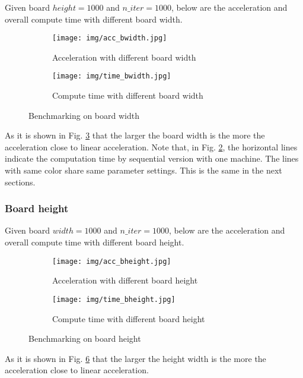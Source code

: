 \documentclass[sigchi]{acmart}
\begin{document}
Given board $height=1000$ and $n\_iter=1000$, below are the acceleration and overall compute time with different board width.
\begin{figure}[H]
  \begin{subfigure}[b]{0.45\textwidth}
      \texttt{[image: img/acc\_bwidth.jpg]}
      \caption{Acceleration with different board width}
      \label{fig:acc_bwidth}
  \end{subfigure}

  \begin{subfigure}[b]{0.45\textwidth}
    \texttt{[image: img/time\_bwidth.jpg]}
    \caption{Compute time with different board width}
    \label{fig:time_bwidth}
  \end{subfigure}
  \caption{Benchmarking on board width}
  \label{fig:bwidth}
  
\end{figure}

As it is shown in Fig. \ref{fig:bwidth} that the larger the board width is the more the acceleration close to linear acceleration.
Note that, in Fig. \ref{fig:time_bwidth}, the horizontal lines indicate the computation time by sequential version with one machine. 
The lines with same color share same parameter settings. This is the same in the next sections.

\subsubsection{Board height}

Given board $width=1000$ and $n\_iter=1000$, below are the acceleration and overall compute time with different board height.
\begin{figure}[H]
  \begin{subfigure}[b]{0.45\textwidth}
      \texttt{[image: img/acc\_bheight.jpg]}
      \caption{Acceleration with different board height}
      \label{fig:acc_bheight}
  \end{subfigure}
  \begin{subfigure}[b]{0.45\textwidth}
    \texttt{[image: img/time\_bheight.jpg]}
    \caption{Compute time with different board height}
    \label{fig:time_bheight}
  \end{subfigure}
  \caption{Benchmarking on board height}
  \label{fig:height}
\end{figure}


As it is shown in Fig. \ref{fig:height} that the larger the height width is the more the acceleration close to linear acceleration.
\end{document}
